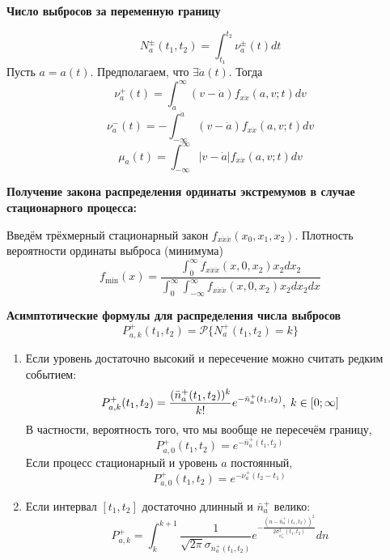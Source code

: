\documentclass[a4paper,11pt, twocolumn]{article}
\begin{document}
\textbf{ Число выбросов за переменную границу }

\[ N_a^\pm (t_1, t_2) = \int_{t_1}^{t_2} \nu_a^{\pm}(t) dt \]
Пусть $ a = a(t) $.
Предполагаем, что $ \exists \dot a(t) $.
Тогда
\[ \nu_a^+(t) = \int_{\dot a}^{\infty} (v - \dot a) f_{x \dot x} (a,v; t) dv \]
\[ \nu_a^-(t) = - \int_{- \infty}^{\dot a} (v - \dot a) f_{x \dot x} (a,v; t) dv \]
\[ \mu_a(t) = \int_{- \infty}^{\infty} |v - \dot a| f_{x \dot x} (a,v; t) dv \]

\textbf{ Получение закона распределения ординаты экстремумов в случае стационарного процесса: }

Введём трёхмерный стационарный закон $ f_{x \dot x \ddot x}(x_0, x_1, x_2) $.
Плотность вероятности ординаты выброса (минимума)
\[ f_{\min}(x) = \frac{ \int_{0}^{\infty} f_{x \dot x \ddot x}(x, 0, x_2) x_2 d x_2 }{ \int_{0}^{\infty} \int_{- \infty}^{\infty} f_{x \dot x \ddot x}(x, 0, x_2) x_2 dx_2 dx } \]

\textbf{ Асимптотические формулы для распределения числа выбросов }
\[ P^+_{a,k}(t_1, t_2) = \mathcal{P}\{ N_a^+(t_1, t_2) = k \} \]
\begin{enumerate}[noitemsep]
    \item Если уровень достаточно высокий и пересечение можно считать редким событием:
    \[ P^+_{a,k}(t_1, t_2) = \frac{ (\bar n_a^+(t_1, t_2))^k }{ k! } e^{- \bar n_a^+(t_1, t_2)}, \thickspace k \in [ 0; \infty ] \]
    В частности, вероятность того, что мы вообще не пересечём границу,
    \[ P_{a,0}^+(t_1,t_2) = e^{ - \bar n_a^+(t_1, t_2) } \]
    Если процесс стационарный и уровень $ a $ постоянный,
    \[ P_{a,0}^+(t_1,t_2) = e^{ - \nu_a^+(t_2-t_1)} \]
    \item Если интервал $ [t_1,t_2] $ достаточно длинный и $ \bar n_a^+ $ велико:
    \[ P_{a,k}^+ = \int_{k}^{k+1} \frac{1}{\sqrt{2\pi} \sigma_{n_a^+(t_1,t_2)}} e^{- \frac{ (n - \bar n_a^+(t_1,t_2))^2 }{ 2 \sigma_{n_a^+}^2 (t_1,t_2) }} dn \]
\end{enumerate}


\end{document}
